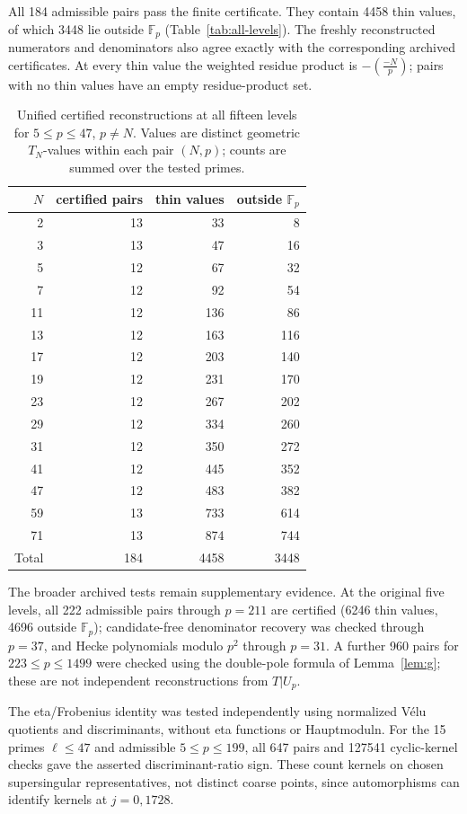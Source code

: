 \documentclass[11pt,a4paper]{article}
\numberwithin{equation}{section}
\theoremstyle{definition}
\theoremstyle{remark}
\newcommand{\Fp}{\mathbb F_p}
\begin{document}
All 184 admissible pairs pass the finite certificate. They contain
4458 thin values, of which 3448 lie outside $\Fp$
(Table~\ref{tab:all-levels}). The freshly reconstructed numerators and
denominators also agree exactly with the corresponding archived certificates.
At every thin value the weighted residue product is
$-\left(\frac{-N}{p}\right)$; pairs with no thin values have an empty
residue-product set.

\begin{table}[htbp]\centering\small
\begin{tabular}{rrrr}\toprule
$N$ & certified pairs & thin values & outside $\Fp$\\\midrule
2&13&33&8\\
3&13&47&16\\
5&12&67&32\\
7&12&92&54\\
11&12&136&86\\
13&12&163&116\\
17&12&203&140\\
19&12&231&170\\
23&12&267&202\\
29&12&334&260\\
31&12&350&272\\
41&12&445&352\\
47&12&483&382\\
59&13&733&614\\
71&13&874&744\\
\midrule
Total&184&4458&3448\\\bottomrule
\end{tabular}
\caption{Unified certified reconstructions at all fifteen levels for
$5\le p\le47$, $p\ne N$. Values are distinct geometric $T_N$-values
within each pair $(N,p)$; counts are summed over the tested primes.}
\label{tab:all-levels}\label{tab:n0-levels}\label{tab:new-levels}
\end{table}

The broader archived tests remain supplementary evidence. At the original
five levels, all 222 admissible pairs through $p=211$ are certified
(6246 thin values, 4696 outside $\Fp$); candidate-free denominator recovery
was checked through $p=37$, and Hecke polynomials modulo $p^2$ through
$p=31$. A further 960 pairs for $223\le p\le1499$ were checked using the
double-pole formula of Lemma~\ref{lem:g}; these are not independent
reconstructions from $T|U_p$.

The eta/Frobenius identity was tested independently using normalized
V\'elu quotients and discriminants, without eta functions or Hauptmoduln.
For the 15 primes $\ell\le47$ and admissible $5\le p\le199$, all 647 pairs
and 127541 cyclic-kernel checks gave the asserted discriminant-ratio sign.
These count kernels on chosen supersingular representatives, not distinct
coarse points, since automorphisms can identify kernels at $j=0,1728$.
\end{document}
